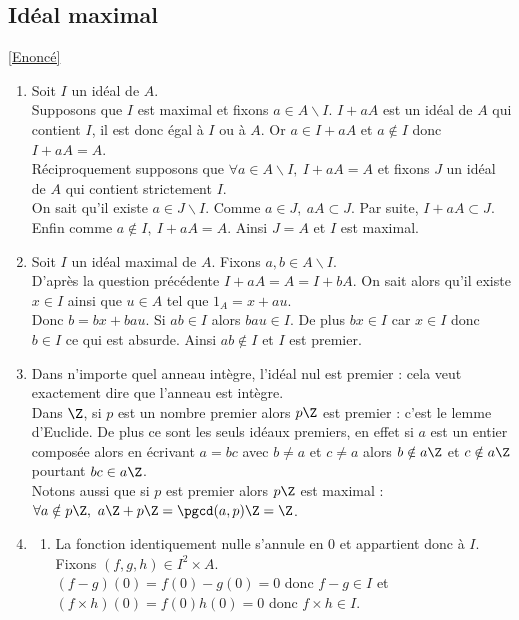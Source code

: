 \documentclass[8pt]{book}
\begin{document}
	\subsection{Idéal maximal }
	\label{Idéal maximal corrigé}
	\textcolor{blue}{\hyperref[Idéal maximal]{[Enoncé]}}\\
	\begin{enumerate}[leftmargin=*]
		\item Soit $I$ un idéal de $A$.\\
		Supposons que $I$ est maximal et fixons $a\in A\backslash I$. $I+aA$ est un idéal de $A$ qui contient $I$, il est donc égal à $I$ ou à $A$. Or $a\in I+aA$ et $a\notin I$ donc $I+aA=A$.\\
		Réciproquement supposons que $\forall a\in A\backslash I,\ I+aA=A$ et fixons $J$ un idéal de $A$ qui contient strictement $I$.\\
		On sait qu'il existe $a\in J\backslash I$. Comme $a\in J,\ aA\subset J$. Par suite, $I+aA\subset J$. Enfin comme $a\notin I,\ I+aA=A$. Ainsi $J=A$ et $I$ est maximal.
		\item Soit $I$ un idéal maximal de $A$. Fixons $a,b\in A\backslash I$.\\
		D'après la question précédente $I+aA=A=I+bA$. On sait alors qu'il existe $x\in I$ ainsi que $u\in A$ tel que $1_A=x+au$.\\
		Donc $b=bx+bau$. Si $ab\in I$ alors $bau\in I$. De plus $bx\in I$ car $x\in I$ donc $b\in I$ ce qui est absurde. Ainsi $ab\notin I$ et $I$ est premier.
		\item Dans n'importe quel anneau intègre, l'idéal nul est premier : cela veut exactement dire que l'anneau est intègre.\\
		Dans $\Z$, si $p$ est un nombre premier alors $p\Z$ est premier : c'est le lemme d'Euclide. De plus ce sont les seuls idéaux premiers, en effet si $a$ est un entier composée alors en écrivant $a=bc$ avec $b\ne a$ et $c\ne a$ alors $b\notin a\Z$ et $c\notin a\Z$ pourtant $bc\in a\Z$.\\
		Notons aussi que si $p$ est premier alors $p\Z$ est maximal : $\forall a\notin p\Z,\ a\Z+p\Z=\pgcd(a,p)\Z=\Z$.
		\item
		\begin{enumerate}[label=\alph*.]
			\item La fonction identiquement nulle s'annule en $0$ et appartient donc à $I$. Fixons $(f,g,h)\in I^2\times A$.\\
			$(f-g)(0)=f(0)-g(0)=0$ donc $f-g\in I$ et $(f\times h)(0)=f(0)h(0)=0$ donc $f\times h\in I$.\\

\end{enumerate}
\end{enumerate}
\end{document}

